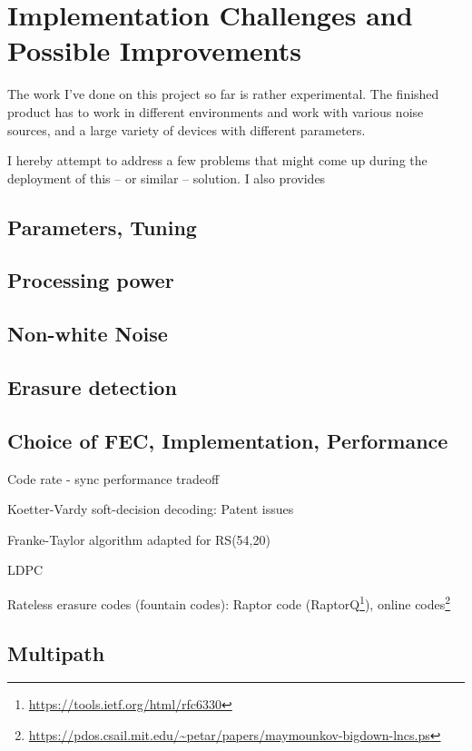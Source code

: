 \documentclass[a4paper]{article}
\begin{document}
\section{Implementation Challenges and Possible Improvements}

The work I've done on this project so far is rather experimental. The 
finished product has to work in different environments and work with 
various noise sources, and a large variety of devices with different 
parameters.

I hereby attempt to address a few problems that might come up during 
the deployment of this -- or similar -- solution. I also provides 

\subsection{Parameters, Tuning}

\subsection{Processing power}

\subsection{Non-white Noise}

\subsection{Erasure detection}

\subsection{Choice of FEC, Implementation, Performance}

Code rate - sync performance tradeoff

Koetter-Vardy soft-decision decoding: Patent issues

Franke-Taylor algorithm adapted for RS(54,20)

LDPC

Rateless erasure codes (fountain codes): Raptor code 
(RaptorQ\footnote{\url{https://tools.ietf.org/html/rfc6330}}), online 
codes\footnote{\url{https://pdos.csail.mit.edu/~petar/papers/maymounkov-bigdown-lncs.ps}}


\subsection{Multipath}
\end{document}
